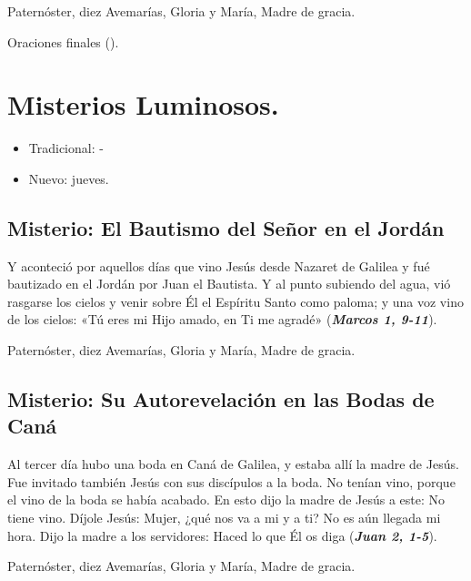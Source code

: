 \documentclass[./main.tex]{subfiles}
\newcounter{lux-counter}
\begin{document}
\begin{center}
      Paternóster, diez Avemarías, Gloria y María, Madre de gracia.
      
      Oraciones finales ().
\end{center}

\section*{Misterios Luminosos.}
\begin{itemize}
      \item Tradicional: -
      \item Nuevo: jueves.
\end{itemize}

\subsection*{ Misterio: El Bautismo del Señor en el Jordán}
Y aconteció por aquellos días que vino Jesús desde Nazaret de Galilea y fué bautizado en el Jordán por Juan el Bautista. 
Y al punto subiendo del agua, vió rasgarse los cielos y venir sobre Él el Espíritu Santo como paloma; 
y una voz vino de los cielos: «Tú eres mi Hijo amado, en Ti me agradé» (\textbf{\emph{Marcos 1, 9-11}}).

\begin{center}
      Paternóster, diez Avemarías, Gloria y María, Madre de gracia.
\end{center}

\subsection*{ Misterio: Su Autorevelación en las Bodas de Caná}
Al tercer día hubo una boda en Caná de Galilea, y estaba allí la madre de Jesús. Fue invitado también Jesús con sus discípulos a la boda. 
No tenían vino, porque el vino de la boda se había acabado. En esto dijo la madre de Jesús a este: No tiene vino. 
Díjole Jesús: Mujer, ¿qué nos va a mi y a ti? No es aún llegada mi hora. Dijo la madre a los servidores: Haced lo que Él os diga (\textbf{\emph{Juan 2, 1-5}}).

\begin{center}
      Paternóster, diez Avemarías, Gloria y María, Madre de gracia.
\end{center}
\end{document}
